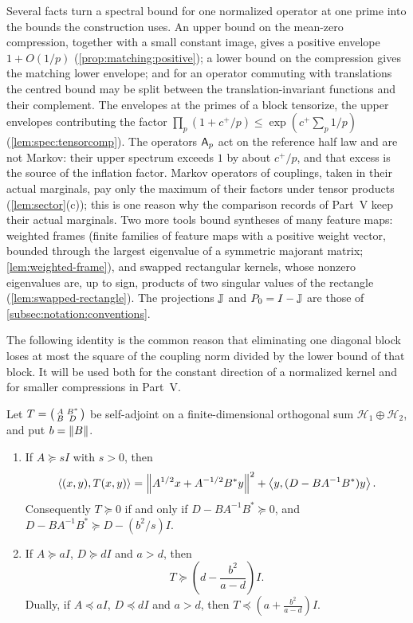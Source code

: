 Several facts turn a spectral bound for one normalized operator at one prime
into the bounds the construction uses. An upper bound on the mean-zero
compression, together with a small constant image, gives a positive envelope
$1+O(1/p)$ (\cref{prop:matching:positive}); a lower bound on the compression
gives the matching lower envelope; and for an operator commuting with
translations the centred bound may be split between the translation-invariant
functions and their complement. The envelopes at the primes of a block
tensorize, the upper envelopes contributing the factor $\prod_p(1+c^+/p)\le\exp(c^+\sum_p1/p)$ (\cref{lem:spec:tensorcomp}). The operators $\mathsf A_p$ act on
the reference half law and are not Markov: their upper spectrum exceeds $1$ by
about $c^+/p$, and that excess is the source of the inflation factor. Markov operators of
couplings, taken in their actual marginals, pay only the maximum of their
factors under tensor products (\cref{lem:sector}(c)); this is one reason why the
comparison records of Part~V keep their actual marginals. Two more tools
bound syntheses of many feature maps: weighted frames (finite
families of feature maps with a positive weight vector, bounded
through the largest eigenvalue of a symmetric majorant matrix;
\cref{lem:weighted-frame}), and
swapped rectangular kernels, whose nonzero eigenvalues are, up to sign,
products of two singular values of the rectangle (\cref{lem:swapped-rectangle}). The
projections $\mathbb J$ and $P_0=I-\mathbb J$ are those of
\cref{subsec:notation:conventions}.

The following identity is the common reason that eliminating one diagonal block loses at most the square of the coupling norm divided by the lower bound of that block. It will be used both for the
constant direction of a normalized kernel and for smaller compressions in
Part~V.

\begin{lemma}\label{lem:block-completion}
Let $T=\begin{psmallmatrix}A&B^*\\B&D\end{psmallmatrix}$ be self-adjoint on
a finite-dimensional orthogonal sum $\mathcal H_1\oplus\mathcal H_2$, and put
$b=\left\|B\right\|$.
\begin{enumerate}[label=\textup{(\alph*)}]
\item If $A\succeq sI$ with $s>0$, then
  \[
    \left\langle (x,y),T(x,y)\right\rangle
    =\left\|A^{1/2}x+A^{-1/2}B^*y\right\|^2
      +\left\langle y,(D-BA^{-1}B^*)y\right\rangle.
  \]
  Consequently $T\succeq0$ if and only if
  $D-BA^{-1}B^*\succeq0$, and
  $D-BA^{-1}B^*\succeq D-(b^2/s)I$.
\item If $A\succeq aI$, $D\succeq dI$ and $a>d$, then
  \[
    T\succeq\left(d-\frac{b^2}{a-d}\right)I.
  \]
  Dually, if $A\preceq aI$, $D\preceq dI$ and $a>d$, then
  $T\preceq\left(a+\frac{b^2}{a-d}\right)I$.
\end{enumerate}
\end{lemma}

